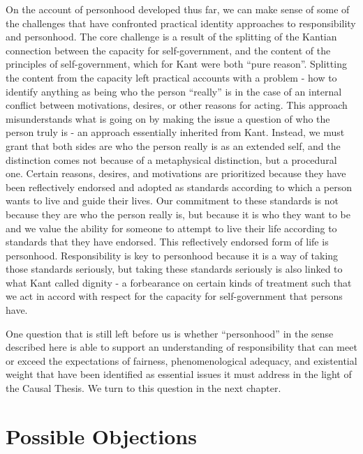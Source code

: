 \documentclass[phd,12pt,oneside,paper=letterpaper]{ubcthesis}
\begin{document}
On the account of personhood developed thus far, we can make sense of some of the challenges that have confronted practical identity approaches to responsibility and personhood. The core challenge is a result of the splitting of the Kantian connection between the capacity for self-government, and the content of the principles of self-government, which for Kant were both ``pure reason''. Splitting the content from the capacity left practical accounts with a problem - how to identify anything as being who the person ``really'' is in the case of an internal conflict between motivations, desires, or other reasons for acting. This approach misunderstands what is going on by making the issue a question of who the person truly is - an approach essentially inherited from Kant. Instead, we must grant that both sides are who the person really is as an extended self, and the distinction comes not because of a metaphysical distinction, but a procedural one. Certain reasons, desires, and motivations are prioritized because they have been reflectively endorsed and adopted as standards according to which a person wants to live and guide their lives. Our commitment to these standards is not because they are who the person really is, but because it is who they want to be and we value the ability for someone to attempt to live their life according to standards that they have endorsed. This reflectively endorsed form of life is personhood. Responsibility is key to personhood because it is a way of taking those standards seriously, but taking these standards seriously is also linked to what Kant called dignity - a forbearance on certain kinds of treatment such that we act in accord with respect for the capacity for self-government that persons have. 

One question that is still left before us is whether ``personhood'' in the sense described here is able to support an understanding of responsibility that can meet or exceed the expectations of fairness, phenomenological adequacy, and existential weight that have been identified as essential issues it must address in the light of the Causal Thesis. We turn to this question in the next chapter. 

\chapter{Possible Objections}
\end{document}
